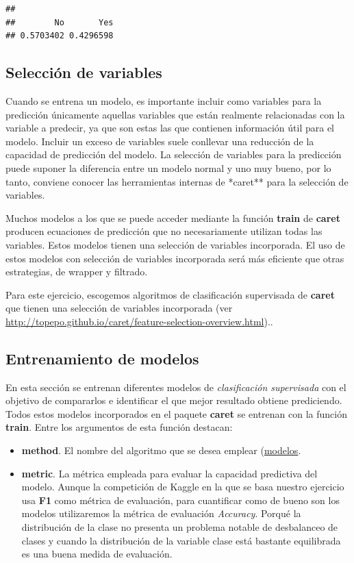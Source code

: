 \documentclass[]{article}
\begin{document}
\begin{verbatim}
## 
##        No       Yes 
## 0.5703402 0.4296598
\end{verbatim}

\hypertarget{selecciuxf3n-de-variables}{%
\subsection{Selección de variables}\label{selecciuxf3n-de-variables}}

Cuando se entrena un modelo, es importante incluir como variables para
la predicción únicamente aquellas variables que están realmente
relacionadas con la variable a predecir, ya que son estas las que
contienen información útil para el modelo. Incluir un exceso de
variables suele conllevar una reducción de la capacidad de predicción
del modelo. La selección de variables para la predicción puede suponer
la diferencia entre un modelo normal y uno muy bueno, por lo tanto,
conviene conocer las herramientas internas de *caret** para la selección
de variables.

Muchos modelos a los que se puede acceder mediante la función
\textbf{train} de \textbf{caret} producen ecuaciones de predicción que
no necesariamente utilizan todas las variables. Estos modelos tienen una
selección de variables incorporada. El uso de estos modelos con
selección de variables incorporada será más eficiente que otras
estrategias, de wrapper y filtrado.

Para este ejercicio, escogemos algoritmos de clasificación supervisada
de \textbf{caret} que tienen una selección de variables incorporada (ver
\url{http://topepo.github.io/caret/feature-selection-overview.html})..

\hypertarget{entrenamiento-de-modelos}{%
\subsection{Entrenamiento de modelos}\label{entrenamiento-de-modelos}}

En esta sección se entrenan diferentes modelos de \emph{clasificación
supervisada} con el objetivo de compararlos e identificar el que mejor
resultado obtiene prediciendo. Todos estos modelos incorporados en el
paquete \textbf{caret} se entrenan con la función \textbf{train}. Entre
los argumentos de esta función destacan:

\begin{itemize}
\item
  \textbf{method}. El nombre del algoritmo que se desea emplear
  (\href{http://topepo.github.io/caret/available-models.html}{modelos}.
\item
  \textbf{metric}. La métrica empleada para evaluar la capacidad
  predictiva del modelo. Aunque la competición de Kaggle en la que se
  basa nuestro ejercicio usa \textbf{F1} como métrica de
  evaluación, para cuantificar como de bueno son los modelos
  utilizaremos la métrica de evaluación \emph{Accuracy}. Porqué la
  distribución de la clase no presenta un problema notable de
  desbalanceo de clases y cuando la distribución de la variable clase
  está bastante equilibrada es una buena medida de evaluación.
\end{itemize}
\end{document}

